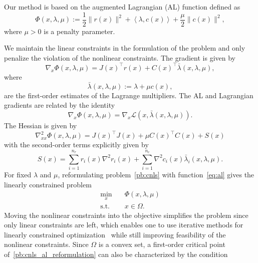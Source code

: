 \documentclass{article}
\numberwithin{equation}{section}
\newcommand{\calL}{{\mathcal{L}}}
\newcommand{\inner}[2]{\left\langle {#1} , {#2} \right\rangle} %
\theoremstyle{plain}
\begin{document}
	Our method is based on the augmented Lagrangian (AL) function defined as
	\begin{equation}\label{eq:al}
		\Phi(x,\lambda,\mu) := \dfrac{1}{2}\|r(x)\|^2 + \inner{\lambda}{c(x)} + \dfrac{\mu}{2} \|c(x)\|^2,
	\end{equation}
	where $\mu > 0$ is a penalty parameter.
	
	We maintain the linear constraints in the formulation of the problem and only penalize the violation of the nonlinear constraints.
	The gradient is given by 
	\begin{equation*}
		\nabla_x \Phi(x,\lambda,\mu) = J(x)^\top r(x) + C(x)^\top\bar{\lambda}(x,\lambda,\mu),
	\end{equation*}
	where
	\begin{equation}\label{eq:1st_order_mult}
		\bar{\lambda}(x,\lambda,\mu):=\lambda + \mu c(x),
	\end{equation} 
	are the first-order estimates of the Lagrange multipliers. The AL and Lagrangian gradients are related by the identity
	\begin{equation}\label{eq:identity_al_lag_grad}
		\nabla_x \Phi(x,\lambda,\mu) = \nabla_x \calL(x,\bar{\lambda}(x,\lambda,\mu)).
	\end{equation}
	The Hessian is given by
	\begin{equation*}
		\nabla^2_{xx} \Phi(x,\lambda,\mu) = J(x)^\top J(x) + \mu C(x)^\top C(x) +  S(x) 
	\end{equation*}
	with the second-order terms explicitly given by
	\begin{equation}\label{eq:al_hessian_2nd_terms}
		S(x) =\sum_{i=1}^{n_r} r_i(x) \nabla^2r_i(x) + \sum_{i=1}^{n_c} \nabla^2 c_i(x) \bar{\lambda}_i(x,\lambda,\mu).
	\end{equation}
	For fixed $\lambda$ and $\mu$, reformulating problem~\eqref{pb:cnls} with function~\eqref{eq:al} gives the linearly constrained problem
	\begin{equation}\label{pb:cnls_al_reformulation} 
		\begin{aligned}
			\min_{x} \quad& \Phi(x,\lambda,\mu)  \\
			\text{s.t.}  \quad & x \in \Omega.
		\end{aligned}	
	\end{equation}
	Moving the nonlinear constraints into the objective simplifies the problem since only linear constraints are left, which enables one to use iterative methods for linearly constrained optimization~\cite{gould-etal:2001,conn-etal:1988b} while still improving feasibility of the nonlinear constraints. Since $\Omega$ is a convex set, a first-order critical point of~\eqref{pb:cnls_al_reformulation} can also be characterized by the condition
\end{document}
